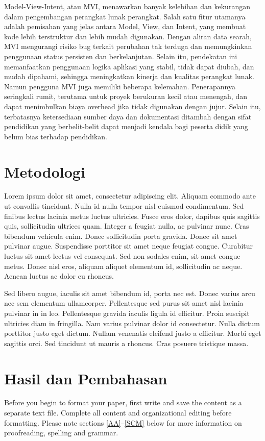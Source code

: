 \documentclass[conference]{IEEEtran}
\begin{document}
Model-View-Intent, atau MVI, menawarkan banyak kelebihan dan kekurangan dalam pengembangan perangkat lunak perangkat. Salah satu fitur utamanya adalah pemisahan yang jelas antara Model, View, dan Intent, yang membuat kode lebih terstruktur dan lebih mudah digunakan. Dengan aliran data searah, MVI mengurangi risiko bug terkait perubahan tak terduga dan memungkinkan penggunaan status persisten dan berkelanjutan. Selain itu, pendekatan ini memanfaatkan penggunaan logika aplikasi yang stabil, tidak dapat diubah, dan mudah dipahami, sehingga meningkatkan kinerja dan kualitas perangkat lunak. Namun pengguna MVI juga memiliki beberapa kelemahan. Penerapannya seringkali rumit, terutama untuk proyek berukuran kecil atau menengah, dan dapat menimbulkan biaya overhead jika tidak digunakan dengan jujur. Selain itu, terbatasnya ketersediaan sumber daya dan dokumentasi ditambah dengan sifat pendidikan yang berbelit-belit dapat menjadi kendala bagi peserta didik yang belum bias terhadap pendidikan.



\section{Metodologi}
Lorem ipsum dolor sit amet, consectetur adipiscing elit. Aliquam commodo ante ut convallis tincidunt. Nulla id nulla tempor nisl euismod condimentum. Sed finibus lectus lacinia metus luctus ultricies. Fusce eros dolor, dapibus quis sagittis quis, sollicitudin ultrices quam. Integer a feugiat nulla, ac pulvinar nunc. Cras bibendum vehicula enim. Donec sollicitudin porta gravida. Donec sit amet pulvinar augue. Suspendisse porttitor sit amet neque feugiat congue. Curabitur luctus sit amet lectus vel consequat. Sed non sodales enim, sit amet congue metus. Donec nisl eros, aliquam aliquet elementum id, sollicitudin ac neque. Aenean luctus ac dolor eu rhoncus.

Sed libero augue, iaculis sit amet bibendum id, porta nec est. Donec varius arcu nec sem elementum ullamcorper. Pellentesque sed purus sit amet nisl lacinia pulvinar in in leo. Pellentesque gravida iaculis ligula id efficitur. Proin suscipit ultricies diam in fringilla. Nam varius pulvinar dolor id consectetur. Nulla dictum porttitor justo eget dictum. Nullam venenatis eleifend justo a efficitur. Morbi eget sagittis orci. Sed tincidunt ut mauris a rhoncus. Cras posuere tristique massa.

\section{Hasil dan Pembahasan}
Before you begin to format your paper, first write and save the content as a 
separate text file. Complete all content and organizational editing before 
formatting. Please note sections \ref{AA}--\ref{SCM} below for more information on 
proofreading, spelling and grammar.
\end{document}
